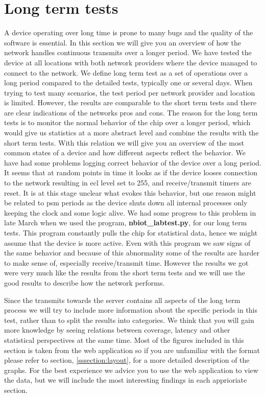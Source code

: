 \documentclass[USenglish]{ifimaster}  %
\begin{document}
\section{Long term tests} \label{section:longtermtest}
A device operating over long time is prone to many bugs and the quality of the software is essential. In this section we will give you an overview of how the network handles continuous transmits over a longer period. We have tested the device at all locations with both network providers where the device managed to connect to the network. We define long term test as a set of operations over a long period compared to the detailed tests, typically one or several days. When trying to test many scenarios, the test period per network provider and location is limited. However, the results are comparable to the short term tests and there are clear indications of the networks pros and cons. The reason for the long term tests is to monitor the normal behavior of the chip over a longer period, which would give us statistics at a more abstract level and combine the results with the short term tests. With this relation we will give you an overview of the most common states of a device and how different aspects reflect the behavior. We have had some problems logging correct behavior of the device over a long period. It seems that at random points in time it looks as if the device looses connection to the network resulting in \acrshort{ecl} level set to 255, and receive/transmit timers are reset. It is at this stage unclear what evokes this behavior, but one reason might be related to \acrshort{psm} periods as the device shuts down all internal processes only keeping the clock and some logic alive. We had some progress to this problem in late March when we used the program, \textbf{nbiot\_labtest.py}, for our long term tests. This program constantly pulls the chip for statistical data, hence we might assume that the device is more active. Even with this program we saw signs of the same behavior and because of this abnormality some of the results are harder to make sense of, especially receive/transmit time. However the results we got were very much like the results from the short term tests and we will use the good results to describe how the network performs.

Since the transmits towards the server contains all aspects of the long term process we will try to include more information about the specific periods in this test, rather than to split the results into categories. We think that you will gain more knowledge by seeing relations between coverage, latency and other statistical perspectives at the same time. Most of the figures included in this section is taken from the web application so if you are unfamiliar with the format please refer to section, \vref{sssection:layout}, for a more detailed description of the graphs. For the best experience we advice you to use the web application to view the data, but we will include the most interesting findings in each apprioriate section.
\end{document}
